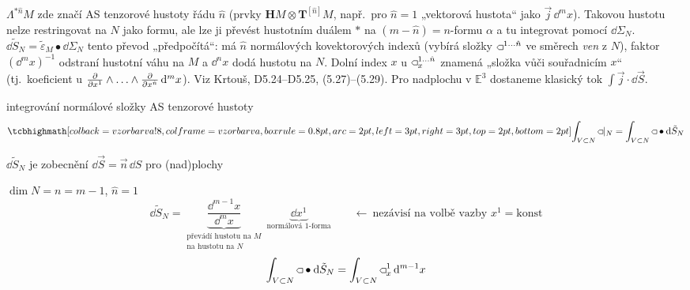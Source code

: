 \begin{vysvetleni}
$\Lambda^{*\hat n}M$ zde značí AS tenzorové hustoty řádu $\hat n$ (prvky $\mathbf HM\otimes\mathbf T^{[\hat n]}M$, např.\ pro $\hat n=1$ „vektorová hustota“ jako $\vec j\,\dd^mx$). Takovou hustotu nelze restringovat na $N$ jako formu, ale lze ji převést hustotním duálem $*$ na $(m-\hat n)=n$-formu $\alpha$ a tu integrovat pomocí $\dd\Sigma_N$. $\dd\tilde S_N=\tilde\varepsilon_M\bullet\dd\Sigma_N$ tento převod „předpočítá“: má $\hat n$ normálových kovektorových indexů (vybírá složky $\gmIpatnactHust^{1\ldots\hat n}$ ve směrech \emph{ven} z $N$), faktor $(\dd^mx)^{-1}$ odstraní hustotní váhu na $M$ a $\dd^nx$ dodá hustotu na $N$. Dolní index $x$ u $\gmIpatnactHust_x^{1\ldots\hat n}$ znamená „složka vůči souřadnicím $x$“ (tj.\ koeficient u $\pdv{x^1}\wedge\ldots\wedge\pdv{x^{\hat n}}\,\dd^mx$). Viz Krtouš, D5.24--D5.25, (5.27)--(5.29). Pro nadplochu v $\mathbb E^3$ dostaneme klasický tok $\int\vec j\cdot\dd\vec S$.
\end{vysvetleni}

\begin{minipage}{0.6\textwidth}
integrování normálové složky AS tenzorové hustoty
\[
  \vzorec{\int_{V\subset N}\gmIpatnactHust|_N = \int_{V\subset N}\gmIpatnactHust\bullet\dd\tilde S_N}
\]
\end{minipage}
\begin{minipage}{0.38\textwidth}
\end{minipage}

\begin{priklad}[Př.]
$\dd\tilde S_N$ je zobecnění $\dd\vec S = \vec n\,\dd S$ pro (nad)plochy

$\dim N = n = m-1$, \quad $\hat n = 1$
\[
  \dd\tilde S_N = \underbrace{\frac{\dd^{m-1}x}{\dd^m x}}_{\substack{\text{převádí hustotu na }M\\\text{na hustotu na }N}}\
  \underbrace{\dd x^1}_{\text{normálová 1-forma}}
  \qquad\leftarrow\ \text{nezávisí na volbě vazby } x^1 = \text{konst}
\]
\[
  \int_{V\subset N}\gmIpatnactHust\bullet\dd\tilde S_N = \int_{V\subset N}\gmIpatnactHust_x^1\,\dd^{m-1}x
\]
\end{priklad}


